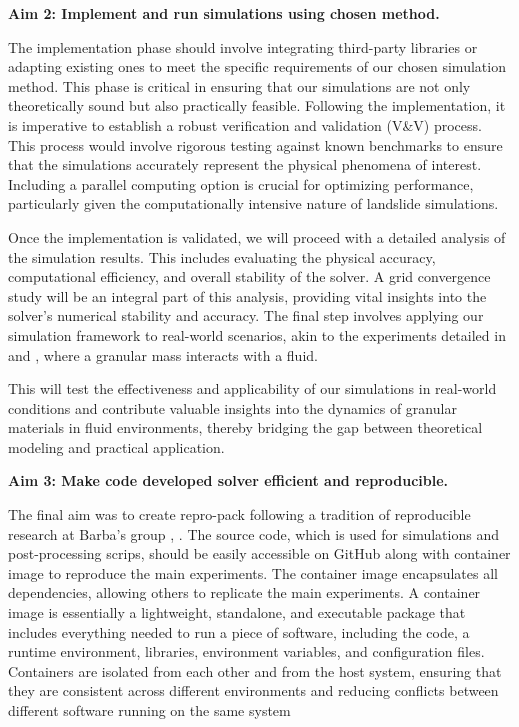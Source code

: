 \textbf{Aim 2: Implement and run simulations using chosen method.} 

The implementation phase should involve integrating third-party libraries or adapting existing ones to meet the specific requirements of our chosen simulation method. This phase is critical in ensuring that our simulations are not only theoretically sound but also practically feasible. Following the implementation, it is imperative to establish a robust verification and validation (V&V) process. This process would involve rigorous testing against known benchmarks to ensure that the simulations accurately represent the physical phenomena of interest. Including a parallel computing option is crucial for optimizing performance, particularly given the computationally intensive nature of landslide simulations.

Once the implementation is validated, we will proceed with a detailed analysis of the simulation results. This includes evaluating the physical accuracy, computational efficiency, and overall stability of the solver. A grid convergence study will be an integral part of this analysis, providing vital insights into the solver's numerical stability and accuracy.
The final step involves applying our simulation framework to real-world scenarios, akin to the experiments detailed in \cite{mao2020resolved} and \cite{shen2022resolved}, where a granular mass interacts with a fluid. 

This will test the effectiveness and applicability of our simulations in real-world conditions and contribute valuable insights into the dynamics of granular materials in fluid environments, thereby bridging the gap between theoretical modeling and practical application.

\textbf{Aim 3: Make code developed solver efficient and reproducible.}

The final aim was to create repro-pack following a tradition of reproducible research at Barba's group \cite{barba2018terminologies}, \cite{Mesnard2023}. The source code, which is used for simulations and post-processing scrips, should be easily accessible on GitHub \cite{github} along with container image \cite{Docker_introduction} to reproduce the main experiments. The container image encapsulates all dependencies, allowing others to replicate the main experiments. A container image is essentially a lightweight, standalone, and executable package that includes everything needed to run a piece of software, including the code, a runtime environment, libraries, environment variables, and configuration files. Containers are isolated from each other and from the host system, ensuring that they are consistent across different environments and reducing conflicts between different software running on the same system

